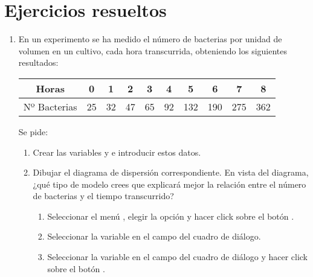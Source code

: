 \section{Ejercicios resueltos}
\begin{enumerate}[leftmargin=*]
\item En un experimento se ha medido el número de bacterias por unidad de volumen en un cultivo, cada hora transcurrida, obteniendo los siguientes resultados:
\begin{center}
\begin{tabular}{c|ccccccccc}
Horas & 0 & 1 & 2 & 3 & 4 & 5 & 6 & 7 & 8  \\
\hline
Nº Bacterias & 25 & 32 & 47 & 65 & 92 & 132 & 190 & 275 & 362
\end{tabular}
\end{center}

Se pide:
\begin{enumerate}
\item  Crear las variables  y  e introducir estos datos.

\item  Dibujar el diagrama de dispersión correspondiente. En vista del diagrama, ¿qué tipo de modelo crees que
explicará mejor la relación entre el número de bacterias y el tiempo transcurrido?
\begin{indicacion}
\begin{enumerate}
\item Seleccionar el menú , elegir la opción  y  
hacer click sobre el botón .
\item Seleccionar la variable  en el 
campo  del cuadro de diálogo. 
\item Seleccionar la variable  en el campo  
del cuadro de diálogo y hacer click sobre el botón .
\end{enumerate}
\end{indicacion}


\end{enumerate}
\end{enumerate}

